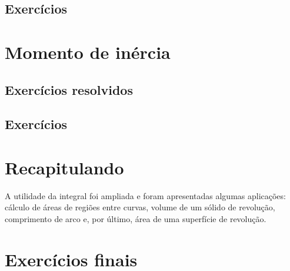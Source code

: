 \cleardoublepage\documentclass[../main.tex]{subfiles}
\begin{document}
\subsection{Exercícios}

\construirExer




\section{Momento de inércia}
\construirSec

\subsection{Exercícios resolvidos}

\construirExeresol


\subsection{Exercícios}

\construirExer

\section{Recapitulando}
A utilidade da integral foi ampliada  e foram apresentadas algumas aplicações: cálculo de áreas de regiões entre curvas, volume de um sólido de revolução, comprimento de arco e, por último, área de uma superfície de revolução.
\section{Exercícios finais}

\construirExer
\end{document}
